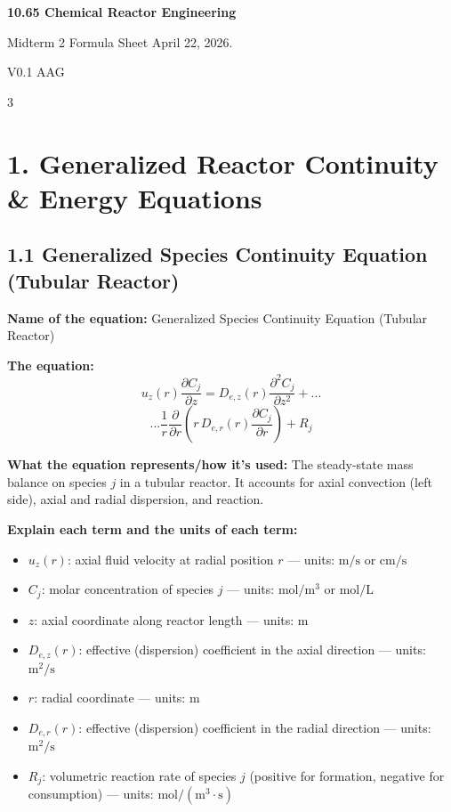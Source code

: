 \documentclass[8pt]{extarticle}
\begin{document}
\footnotesize
\raggedcolumns

\begin{center}
{\bfseries 10.65 Chemical Reactor Engineering}
\end{center}

\author{AAG}
\date{April 22, 2026.}

\small
{\large Midterm 2 Formula Sheet \hfill April 22, 2026.\par}
{\large V0.1 \hfill AAG\par}



\begin{multicols*}{3}

\section*{1. Generalized Reactor Continuity \& Energy Equations}

\subsection*{1.1 Generalized Species Continuity Equation (Tubular Reactor)}

\textbf{Name of the equation:} Generalized Species Continuity Equation (Tubular Reactor)

\textbf{The equation:}
\[
u_z(r)\frac{\partial C_j}{\partial z}
=
D_{e,z}(r)\frac{\partial^2 C_j}{\partial z^2}
+...
\]
\[
...\frac{1}{r}\frac{\partial}{\partial r}\left(r\,D_{e,r}(r)\frac{\partial C_j}{\partial r}\right)
+
R_j
\]

\textbf{What the equation represents/how it's used:} The steady-state mass balance on species \(j\) in a tubular reactor. It accounts for axial convection (left side), axial and radial dispersion, and reaction.

\textbf{Explain each term and the units of each term:}
\begin{itemize}
\item \(u_z(r)\): axial fluid velocity at radial position \(r\) --- units: \(\mathrm{m/s}\) or \(\mathrm{cm/s}\)
\item \(C_j\): molar concentration of species \(j\) --- units: \(\mathrm{mol/m^3}\) or \(\mathrm{mol/L}\)
\item \(z\): axial coordinate along reactor length --- units: \(\mathrm{m}\)
\item \(D_{e,z}(r)\): effective (dispersion) coefficient in the axial direction --- units: \(\mathrm{m^2/s}\)
\item \(r\): radial coordinate --- units: \(\mathrm{m}\)
\item \(D_{e,r}(r)\): effective (dispersion) coefficient in the radial direction --- units: \(\mathrm{m^2/s}\)
\item \(R_j\): volumetric reaction rate of species \(j\) (positive for formation, negative for consumption) --- units: \(\mathrm{mol/(m^3\cdot s)}\)
\end{itemize}


\end{multicols*}
\end{document}
